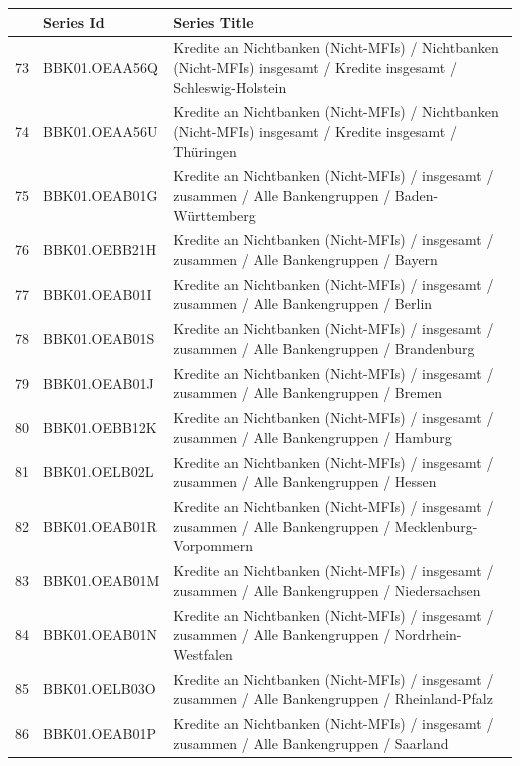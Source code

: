 \documentclass[11pt]{article}
\begin{document}
\begin{table}
\centering
\begin{tabular}{rp{5cm}p{11cm}}  
& \textbf{Series Id} & \textbf{Series Title} \\
  \hline
  \hline

  73 & BBK01.OEAA56Q & Kredite an Nichtbanken (Nicht-MFIs) / Nichtbanken (Nicht-MFIs) insgesamt / Kredite insgesamt / Schleswig-Holstein \\ 
  \hline
  74 & BBK01.OEAA56U & Kredite an Nichtbanken (Nicht-MFIs) / Nichtbanken (Nicht-MFIs) insgesamt / Kredite insgesamt / Thüringen \\ 
  \hline
  75 & BBK01.OEAB01G & Kredite an Nichtbanken (Nicht-MFIs) / insgesamt /  zusammen / Alle Bankengruppen / Baden-Württemberg \\ 
  \hline
  76 & BBK01.OEBB21H & Kredite an Nichtbanken (Nicht-MFIs) / insgesamt / zusammen / Alle Bankengruppen / Bayern \\ 
  \hline
  77 & BBK01.OEAB01I & Kredite an Nichtbanken (Nicht-MFIs) / insgesamt / zusammen / Alle Bankengruppen / Berlin \\ 
  \hline
  78 & BBK01.OEAB01S & Kredite an Nichtbanken (Nicht-MFIs) / insgesamt / zusammen / Alle Bankengruppen / Brandenburg \\ 
  \hline
  79 & BBK01.OEAB01J & Kredite an Nichtbanken (Nicht-MFIs) / insgesamt / zusammen / Alle Bankengruppen / Bremen \\ 
  \hline
  80 & BBK01.OEBB12K & Kredite an Nichtbanken (Nicht-MFIs) / insgesamt / zusammen / Alle Bankengruppen / Hamburg \\ 
  \hline
  81 & BBK01.OELB02L & Kredite an Nichtbanken (Nicht-MFIs) / insgesamt / zusammen / Alle Bankengruppen / Hessen \\ 
  \hline
  82 & BBK01.OEAB01R & Kredite an Nichtbanken (Nicht-MFIs) / insgesamt / zusammen / Alle Bankengruppen / Mecklenburg-Vorpommern \\ 
  \hline
  83 & BBK01.OEAB01M & Kredite an Nichtbanken (Nicht-MFIs) / insgesamt / zusammen / Alle Bankengruppen / Niedersachsen \\ 
  \hline
  84 & BBK01.OEAB01N & Kredite an Nichtbanken (Nicht-MFIs) / insgesamt / zusammen / Alle Bankengruppen / Nordrhein-Westfalen \\ 
  \hline
  85 & BBK01.OELB03O & Kredite an Nichtbanken (Nicht-MFIs) / insgesamt / zusammen / Alle Bankengruppen / Rheinland-Pfalz \\ 
  \hline
  86 & BBK01.OEAB01P & Kredite an Nichtbanken (Nicht-MFIs) / insgesamt / zusammen / Alle Bankengruppen / Saarland \\ 

\end{tabular}
\end{table}
\end{document}
